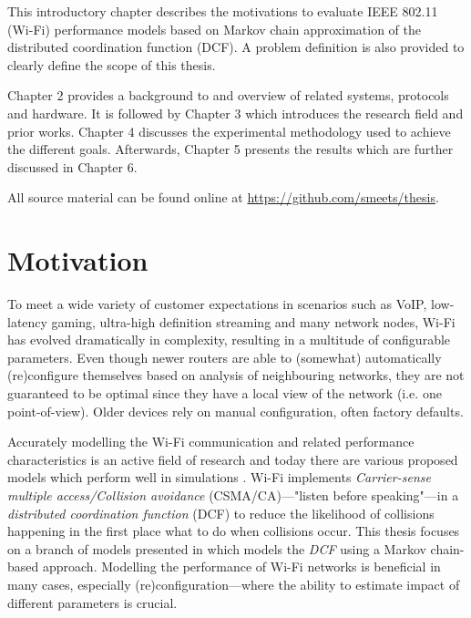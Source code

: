 This introductory chapter describes the motivations to evaluate IEEE 802.11
(Wi-Fi) performance models based on Markov chain approximation of the
distributed coordination function (DCF). A problem definition is also provided
to clearly define the scope of this thesis.

Chapter 2 provides a background to and overview of related systems, protocols
and hardware. It is followed by Chapter 3 which introduces the research field
and prior works. Chapter 4 discusses the experimental methodology used to
achieve the different goals. Afterwards, Chapter 5 presents the results which
are further discussed in Chapter 6.

All source material can be found online at \url{https://github.com/smeets/thesis}.

\section{Motivation}

To meet a wide variety of customer expectations in scenarios such as VoIP,
low-latency gaming, ultra-high definition streaming and many network nodes,
Wi-Fi has evolved dramatically in complexity, resulting in a multitude of
configurable parameters. Even though newer routers are able to (somewhat)
automatically (re)configure themselves based on analysis of neighbouring
networks, they are not guaranteed to be optimal since they have a local view
of the network (i.e. one point-of-view). Older devices rely on manual
configuration, often factory defaults.


Accurately modelling the Wi-Fi communication and related performance
characteristics is an active field of research and today there are various
proposed models which perform well in simulations \cite{bianchi}\cite{felemban}. Wi-Fi implements
\emph{Carrier-sense multiple access/Collision avoidance} (CSMA/CA)—"listen
before speaking"—in a \emph{distributed coordination function} (DCF) to reduce
the likelihood of collisions happening in the first place what to do when
collisions occur.  This thesis focuses on a branch of models presented in
\cite{bianchi} which models the \emph{DCF} using a Markov chain-based
approach. Modelling the performance of Wi-Fi networks is beneficial in many
cases, especially (re)configuration—where the ability to estimate impact of
different parameters is crucial.

